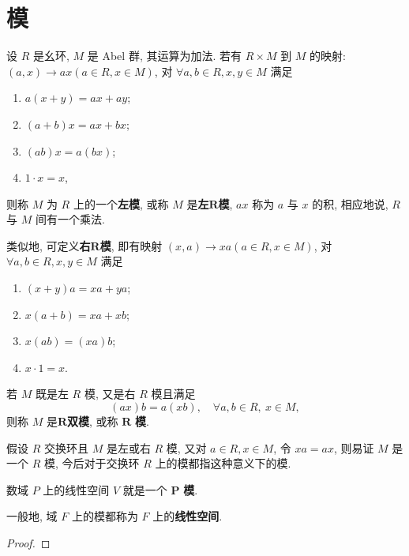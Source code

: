 \documentclass[../../main.tex]{subfiles}%
\begin{document}
\section{模}

\begin{definition}[模]
设 \( R \) 是幺环, \( M \) 是 Abel 群, 其运算为加法. 若有 \( R \times M \) 到 \( M \) 的映射: \( (a,x) \to ax (a \in R, x \in M) \), 对 \( \forall a,b \in R, x,y \in M \) 满足
\begin{enumerate}[(1)]
\item \( a(x + y) = ax + ay \);
\item \( (a + b)x = ax + bx \);
\item \( (ab)x = a(bx) \);
\item \( 1 \cdot x = x \),
\end{enumerate}
则称 \( M \) 为 \( R \) 上的一个\textbf{左模}, 或称 \( M \) 是\textbf{左}\(\boldsymbol{R}\)\textbf{模}, \( ax \) 称为 \( a \) 与 \( x \) 的积, 相应地说, \( R \) 与 \( M \) 间有一个乘法.

类似地, 可定义\textbf{右}\(\boldsymbol{R}\)\textbf{模}, 即有映射 \( (x,a) \to xa (a \in R, x \in M) \), 对 \( \forall a,b \in R, x,y \in M \) 满足
\begin{enumerate}[(1)]
\item \( (x + y)a = xa + ya \);
\item \( x(a + b) = xa + xb \);
\item \( x(ab) = (xa)b \);
\item \( x \cdot 1 = x \).
\end{enumerate}

若 \( M \) 既是左 \( R \) 模, 又是右 \( R \) 模且满足
\[
(ax)b = a(xb), \quad \forall a,b \in R, \ x \in M,
\]
则称 \( M \) 是\(\boldsymbol{R}\)\textbf{双模}, 或称 \( \boldsymbol{R} \) \textbf{模}.
\end{definition}
\begin{remark}
假设 \( R \) 交换环且 \( M \) 是左或右 \( R \) 模, 又对 \( a \in R, x \in M \), 令 \( xa = ax \), 则易证 \( M \) 是一个 \( R \) 模, 今后对于交换环 \( R \) 上的模都指这种意义下的模.
\end{remark}

\begin{theorem}\label{theorem:域上的线性空间}
数域 \( P \) 上的线性空间 \( V \) 就是一个 \( \boldsymbol{P} \) \textbf{模}. 

一般地, 域 \( F \) 上的模都称为 \( F \) 上的\textbf{线性空间}.
\end{theorem}
\begin{proof}

\end{proof}
\end{document}
